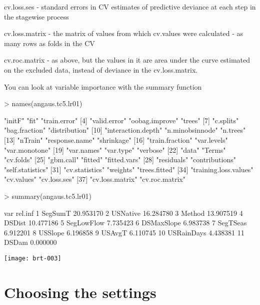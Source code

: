 \documentclass{article}
\begin{document}
cv.loss.ses - standard errors in CV estimates of predictive deviance at each step in the stagewise process

cv.loss.matrix - the matrix of values from which cv.values were calculated - as many rows as folds in the CV

cv.roc.matrix - as above, but the values in it are area under the curve estimated on the excluded data, instead of deviance in the cv.loss.matrix.

You can look at variable importance with the summary function
\begin{Schunk}
\begin{Sinput}
> names(angaus.tc5.lr01)
\end{Sinput}
\begin{Soutput}
 [1] "initF"                "fit"                  "train.error"         
 [4] "valid.error"          "oobag.improve"        "trees"               
 [7] "c.splits"             "bag.fraction"         "distribution"        
[10] "interaction.depth"    "n.minobsinnode"       "n.trees"             
[13] "nTrain"               "response.name"        "shrinkage"           
[16] "train.fraction"       "var.levels"           "var.monotone"        
[19] "var.names"            "var.type"             "verbose"             
[22] "data"                 "Terms"                "cv.folds"            
[25] "gbm.call"             "fitted"               "fitted.vars"         
[28] "residuals"            "contributions"        "self.statistics"     
[31] "cv.statistics"        "weights"              "trees.fitted"        
[34] "training.loss.values" "cv.values"            "cv.loss.ses"         
[37] "cv.loss.matrix"       "cv.roc.matrix"       
\end{Soutput}
\begin{Sinput}
> summary(angaus.tc5.lr01)
\end{Sinput}
\begin{Soutput}
          var   rel.inf
1     SegSumT 20.953170
2    USNative 16.284780
3      Method 13.907519
4      DSDist 10.477186
5  SegLowFlow  7.735423
6  DSMaxSlope  6.983738
7    SegTSeas  6.912201
8     USSlope  6.196858
9      USAvgT  6.110745
10 USRainDays  4.438381
11      DSDam  0.000000
\end{Soutput}
\end{Schunk}
\texttt{[image: brt-003]}

\section{Choosing the settings}
\end{document}
